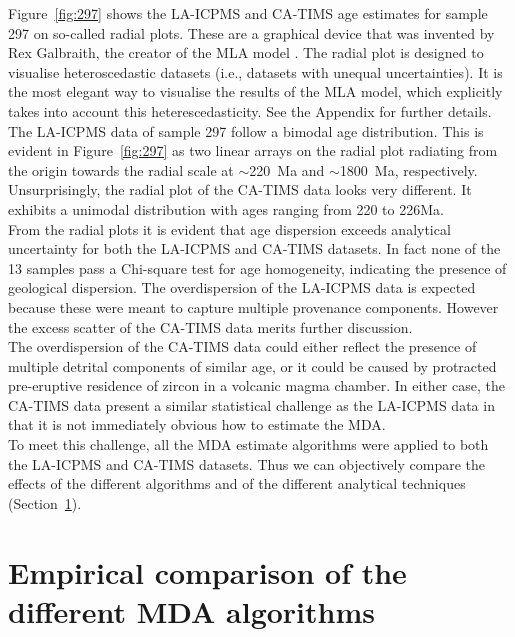 \documentclass{article}
\begin{document}
Figure~\ref{fig:297} shows the LA-ICPMS and CA-TIMS age estimates for
sample 297 on so-called radial plots. These are a graphical device
that was invented by Rex Galbraith, the creator of the MLA model
\citep{galbraith1988, galbraith1990a}. The radial plot is designed to
visualise heteroscedastic datasets (i.e., datasets with unequal
uncertainties).  It is the most elegant way to visualise the results
of the MLA model, which explicitly takes into account this
heterescedasticity. See the Appendix for further details.\\

The LA-ICPMS data of sample 297 follow a bimodal age distribution.
This is evident in Figure~\ref{fig:297} as two linear arrays on the
radial plot radiating from the origin towards the radial scale at
$\sim$220~Ma and $\sim$1800~Ma, respectively. Unsurprisingly, the
radial plot of the CA-TIMS data looks very different. It exhibits a
unimodal distribution with ages ranging from 220 to 226Ma.\\

From the radial plots it is evident that age dispersion exceeds
analytical uncertainty for both the LA-ICPMS and CA-TIMS datasets. In
fact none of the 13 samples pass a Chi-square test for age
homogeneity, indicating the presence of geological dispersion.  The
overdispersion of the LA-ICPMS data is expected because these were
meant to capture multiple provenance components. However the excess
scatter of the CA-TIMS data merits further discussion.\\

The overdispersion of the CA-TIMS data could either reflect the
presence of multiple detrital components of similar age, or it could
be caused by protracted pre-eruptive residence of zircon in a volcanic
magma chamber.  In either case, the CA-TIMS data present a similar
statistical challenge as the LA-ICPMS data in that it is not
immediately obvious how to estimate the MDA.\\

To meet this challenge, all the MDA estimate algorithms were applied
to both the LA-ICPMS and CA-TIMS datasets. Thus we can objectively
compare the effects of the different algorithms and of the different
analytical techniques (Section~\ref{sec:comparison}).

\section{Empirical comparison of the different MDA algorithms}
\label{sec:comparison}
\end{document}
